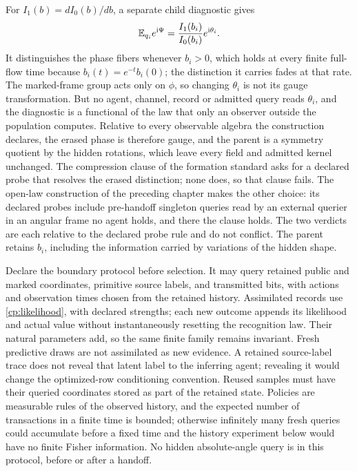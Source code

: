 For $I_1(b)=dI_0(b)/db$, a separate child diagnostic gives
\begin{equation}
 \mathbb E_{q_i}e^{\mathrm i\Psi}
 =\frac{I_1(b_i)}{I_0(b_i)}e^{\mathrm i\theta_i}.
 \label{cp:phase-diagnostic}
\end{equation}
It distinguishes the phase fibers whenever $b_i>0$, which holds at every finite full-flow time because $b_i(t)=e^{-t}b_i(0)$; the distinction it carries fades at that rate. The marked-frame group acts only on $\phi$, so changing $\theta_i$ is not its gauge transformation. But no agent, channel, record or admitted query reads $\theta_i$, and the diagnostic is a functional of the law that only an observer outside the population computes. Relative to every observable algebra the construction declares, the erased phase is therefore gauge, and the parent is a symmetry quotient by the hidden rotations, which leave every field and admitted kernel unchanged. The compression clause of the formation standard asks for a declared probe that resolves the erased distinction; none does, so that clause fails. The open-law construction of the preceding chapter makes the other choice: its declared probes include pre-handoff singleton queries read by an external querier in an angular frame no agent holds, and there the clause holds. The two verdicts are each relative to the declared probe rule and do not conflict. The parent retains $b_i$, including the information carried by variations of the hidden shape.

Declare the boundary protocol before selection. It may query retained public and marked coordinates, primitive source labels, and transmitted bits, with actions and observation times chosen from the retained history. Assimilated records use \cref{cp:likelihood}, with declared strengths; each new outcome appends its likelihood and actual value without instantaneously resetting the recognition law. Their natural parameters add, so the same finite family remains invariant. Fresh predictive draws are not assimilated as new evidence. A retained source-label trace does not reveal that latent label to the inferring agent; revealing it would change the optimized-row conditioning convention. Reused samples must have their queried coordinates stored as part of the retained state. Policies are measurable rules of the observed history, and the expected number of transactions in a finite time is bounded; otherwise infinitely many fresh queries could accumulate before a fixed time and the history experiment below would have no finite Fisher information. No hidden absolute-angle query is in this protocol, before or after a handoff.

